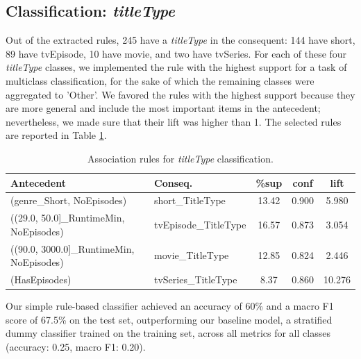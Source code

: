 \subsection{Classification: \textit{titleType}}
Out of the extracted rules, 245 have a \textit{titleType} in the consequent: 144 have short, 89 have tvEpisode, 10 have movie, and two have tvSeries.
For each of these four \textit{titleType} classes, we implemented the rule with the highest support for a task of multiclass classification, for the sake of which the remaining classes were aggregated to 'Other'. We favored the rules with the highest support because they are more general and include the most important items in the antecedent; nevertheless, we made sure that their lift was higher than 1. The selected rules are reported in Table \ref{tab:association_rules_titleType}.

\begin{table}
    \small  %
    \setlength{\tabcolsep}{4pt}  %
    \renewcommand{\arraystretch}{1}  %
    \centering
    \begin{tabular}{p{2.4cm}p{1.4cm}ccc}
    \toprule
    \textbf{Antecedent} & \textbf{Conseq.} & \textbf{\%sup} & \textbf{conf} & \textbf{lift} \\
    \midrule
    (genre\_Short, NoEpisodes) & short\newline \_TitleType & 13.42 & 0.900 & 5.980 \\
    ((29.0, 50.0]\_\newline RuntimeMin, NoEpisodes) & tvEpisode\newline \_TitleType & 16.57 & 0.873 & 3.054 \\
    ((90.0, 3000.0]\_\newline RuntimeMin, NoEpisodes)	 & movie\newline \_TitleType & 12.85 & 0.824 & 2.446 \\
    (HasEpisodes) & tvSeries\newline \_TitleType & 8.37 & 0.860 & 10.276 \\
    \bottomrule
    \end{tabular}
    \caption{Association rules for \textit{titleType} classification.}
    \label{tab:association_rules_titleType}
\end{table}

Our simple rule-based classifier  achieved an accuracy of 60\% and a macro F1 score of 67.5\% on the test set, outperforming our baseline model, a stratified dummy classifier trained on the training set, across all metrics for all classes (accuracy: 0.25, macro F1: 0.20).

